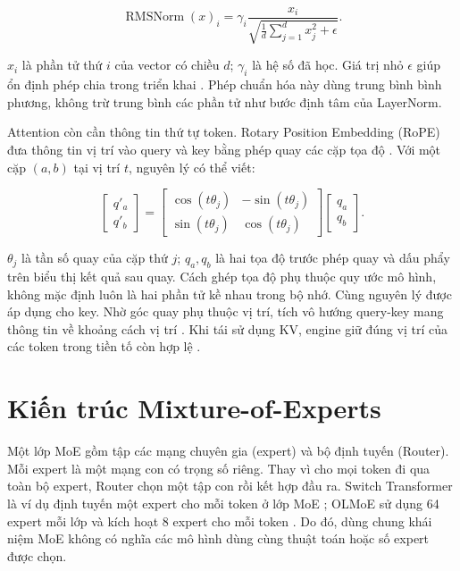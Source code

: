 \begin{equation}
\label{eq:2.3}
\operatorname{RMSNorm}(x)_i=\gamma_i\frac{x_i}{\sqrt{\frac{1}{d}\sum_{j=1}^{d}x_j^2+\epsilon}}.
\end{equation}

$x_i$ là phần tử thứ $i$ của vector có chiều $d$; $\gamma_i$ là hệ số đã học. Giá trị nhỏ $\epsilon$ giúp ổn định phép chia trong triển khai \cite{moe_tierengine_arch}. Phép chuẩn hóa này dùng trung bình bình phương, không trừ trung bình các phần tử như bước định tâm của LayerNorm.

Attention còn cần thông tin thứ tự token. Rotary Position Embedding (RoPE) đưa thông tin vị trí vào query và key bằng phép quay các cặp tọa độ \cite[mục 3.2]{roformer}. Với một cặp $(a,b)$ tại vị trí $t$, nguyên lý có thể viết:

\begin{equation}
\label{eq:2.4}
\begin{bmatrix}q'_a\\q'_b\end{bmatrix}
=\begin{bmatrix}\cos(t\theta_j)&-\sin(t\theta_j)\\\sin(t\theta_j)&\cos(t\theta_j)\end{bmatrix}
\begin{bmatrix}q_a\\q_b\end{bmatrix}.
\end{equation}

$\theta_j$ là tần số quay của cặp thứ $j$; $q_a,q_b$ là hai tọa độ trước phép quay và dấu phẩy trên biểu thị kết quả sau quay. Cách ghép tọa độ phụ thuộc quy ước mô hình, không mặc định luôn là hai phần tử kề nhau trong bộ nhớ. Cùng nguyên lý được áp dụng cho key. Nhờ góc quay phụ thuộc vị trí, tích vô hướng query-key mang thông tin về khoảng cách vị trí \cite{roformer}. Khi tái sử dụng KV, engine giữ đúng vị trí của các token trong tiền tố còn hợp lệ \cite{moe_tierengine_arch}.

\section{Kiến trúc Mixture-of-Experts}

Một lớp MoE gồm tập các mạng chuyên gia (expert) và bộ định tuyến (Router). Mỗi expert là một mạng con có trọng số riêng. Thay vì cho mọi token đi qua toàn bộ expert, Router chọn một tập con rồi kết hợp đầu ra. Switch Transformer là ví dụ định tuyến một expert cho mỗi token ở lớp MoE \cite{switch_transformers}; OLMoE sử dụng 64 expert mỗi lớp và kích hoạt 8 expert cho mỗi token \cite[mục 1]{olmoe}. Do đó, dùng chung khái niệm MoE không có nghĩa các mô hình dùng cùng thuật toán hoặc số expert được chọn.

